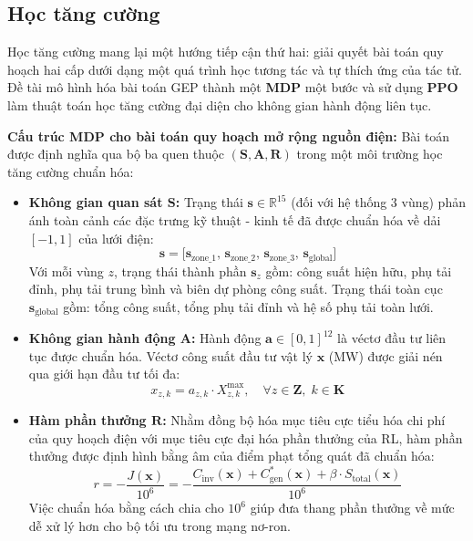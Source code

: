 \subsection{Học tăng cường}
Học tăng cường mang lại một hướng tiếp cận thứ hai: giải quyết bài toán quy hoạch hai cấp dưới dạng một quá trình học tương tác và tự thích ứng của tác tử. Đề tài mô hình hóa bài toán GEP thành một \textbf{MDP} một bước và sử dụng \textbf{PPO} làm thuật toán học tăng cường đại diện cho không gian hành động liên tục.

\textbf{Cấu trúc MDP cho bài toán quy hoạch mở rộng nguồn điện:}
Bài toán được định nghĩa qua bộ ba quen thuộc $(\mathbf{S}, \mathbf{A}, \mathbf{R})$ trong một môi trường học tăng cường chuẩn hóa:
\begin{itemize}
    \item \textbf{Không gian quan sát $\mathbf{S}$:} Trạng thái $\mathbf{s} \in \mathbb{R}^{15}$ (đối với hệ thống 3 vùng) phản ánh toàn cảnh các đặc trưng kỹ thuật - kinh tế đã được chuẩn hóa về dải $[-1, 1]$ của lưới điện:
    \begin{equation}
        \mathbf{s} = \Big[ \mathbf{s}_{\text{zone\_1}}, \, \mathbf{s}_{\text{zone\_2}}, \, \mathbf{s}_{\text{zone\_3}}, \, \mathbf{s}_{\text{global}} \Big]
    \end{equation}
    Với mỗi vùng $z$, trạng thái thành phần $\mathbf{s}_z$ gồm: công suất hiện hữu, phụ tải đỉnh, phụ tải trung bình và biên dự phòng công suất. Trạng thái toàn cục $\mathbf{s}_{\text{global}}$ gồm: tổng công suất, tổng phụ tải đỉnh và hệ số phụ tải toàn lưới.
    \item \textbf{Không gian hành động $\mathbf{A}$:} Hành động $\mathbf{a} \in [0, 1]^{12}$ là véctơ đầu tư liên tục được chuẩn hóa. Véctơ công suất đầu tư vật lý $\mathbf{x}$ (MW) được giải nén qua giới hạn đầu tư tối đa:
    \begin{equation}
        x_{z,k} = a_{z,k} \cdot X_{z,k}^{\max}, \quad \forall z \in \mathbf{Z}, \; k \in \mathbf{K}
    \end{equation}
    \item \textbf{Hàm phần thưởng $\mathbf{R}$:} Nhằm đồng bộ hóa mục tiêu cực tiểu hóa chi phí của quy hoạch điện với mục tiêu cực đại hóa phần thưởng của RL, hàm phần thưởng được định hình bằng âm của điểm phạt tổng quát đã chuẩn hóa:
    \begin{equation}
        r = - \frac{J(\mathbf{x})}{10^6} = - \frac{C_{\text{inv}}(\mathbf{x}) + C_{\text{gen}}^*(\mathbf{x}) + \beta \cdot S_{\text{total}}(\mathbf{x})}{10^6}
    \end{equation}
    Việc chuẩn hóa bằng cách chia cho $10^6$ giúp đưa thang phần thưởng về mức dễ xử lý hơn cho bộ tối ưu trong mạng nơ-ron.
\end{itemize}

